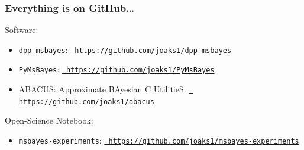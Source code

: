 \begin{frame}
    \frametitle{Everything is on GitHub\ldots}
    Software:\\
    \begin{itemize}
        \item \texttt{dpp-msbayes}:
            \href{https://github.com/joaks1/dpp-msbayes}{\tt
            https://github.com/joaks1/dpp-msbayes}

        \item \texttt{PyMsBayes}:
            \href{https://github.com/joaks1/PyMsBayes}{\tt
            https://github.com/joaks1/PyMsBayes}

        \item ABACUS: Approximate BAyesian C UtilitieS.
            \href{https://github.com/joaks1/abacus}{\tt
            https://github.com/joaks1/abacus}
    \end{itemize}

    \medskip
    Open-Science Notebook:\\
    \begin{itemize}
        \item \texttt{msbayes-experiments}:
            \href{https://github.com/joaks1/msbayes-experiments}{\tt
            https://github.com/joaks1/msbayes-experiments}
    \end{itemize}
\end{frame}

